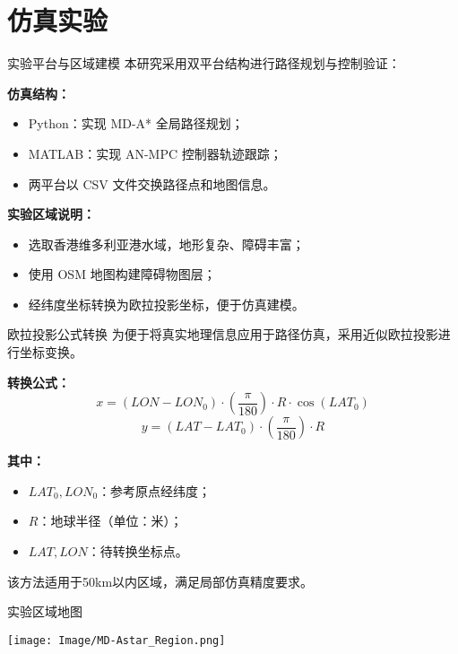 \section{仿真实验}

\begin{frame}{实验平台与区域建模}
\justifying
本研究采用双平台结构进行路径规划与控制验证：

\vspace{0.5em}
\textbf{仿真结构：}
\begin{itemize}
    \item Python：实现 MD-A* 全局路径规划；
    \item MATLAB：实现 AN-MPC 控制器轨迹跟踪；
    \item 两平台以 CSV 文件交换路径点和地图信息。
\end{itemize}

\vspace{0.5em}
\textbf{实验区域说明：}
\begin{itemize}
    \item 选取香港维多利亚港水域，地形复杂、障碍丰富；
    \item 使用 OSM 地图构建障碍物图层；
    \item 经纬度坐标转换为欧拉投影坐标，便于仿真建模。
\end{itemize}
\end{frame}

\begin{frame}{欧拉投影公式转换}
\justifying
为便于将真实地理信息应用于路径仿真，采用近似欧拉投影进行坐标变换。

\textbf{转换公式：}
\[
x = \left( LON - LON_0 \right) \cdot \left( \frac{\pi}{180} \right) \cdot R \cdot \cos(LAT_0)
\]
\[
y = \left( LAT - LAT_0 \right) \cdot \left( \frac{\pi}{180} \right) \cdot R
\]

\textbf{其中：}
\begin{itemize}
    \item $LAT_0, LON_0$：参考原点经纬度；
    \item $R$：地球半径（单位：米）；
    \item $LAT, LON$：待转换坐标点。
\end{itemize}
该方法适用于50km以内区域，满足局部仿真精度要求。
\end{frame}

\begin{frame}[plain]{实验区域地图}
\begin{center}
    \texttt{[image: Image/MD-Astar\_Region.png]}
\end{center}
\end{frame}

